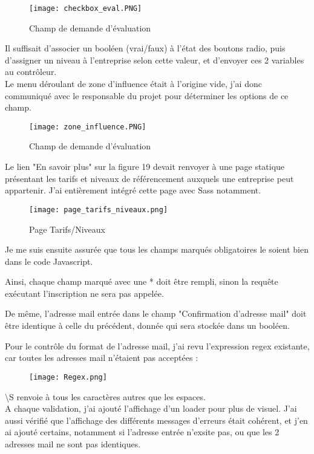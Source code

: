\begin{figure}[H]
    \texttt{[image: checkbox\_eval.PNG]}
    \caption{Champ de demande d'évaluation}
\end{figure}

Il suffisait d'associer un booléen (vrai/faux) à l'état des boutons radio, puis d'assigner un niveau à l'entreprise selon cette valeur, et d'envoyer ces 2 variables au contrôleur.\\

Le menu déroulant de zone d'influence était à l'origine vide, j'ai donc communiqué avec le responsable du projet pour déterminer les options de ce champ.

\begin{figure}[H]
    \texttt{[image: zone\_influence.PNG]}
    \caption{Champ de demande d'évaluation}
\end{figure}

Le lien "En savoir plus" sur la figure 19 devait renvoyer à une page statique présentant les tarifs et niveaux de référencement auxquels une entreprise peut appartenir. J'ai entièrement intégré cette page avec Sass notamment.

\begin{figure}[H]
    \texttt{[image: page\_tarifs\_niveaux.png]}
    \caption{Page Tarifs/Niveaux}
\end{figure}

Je me suis ensuite assurée que tous les champs marqués obligatoires le soient bien dans le code Javascript. 

Ainsi, chaque champ marqué avec une * doit être rempli, sinon la requête exécutant l'inscription ne sera pas appelée.

De même, l'adresse mail entrée dans le champ "Confirmation d'adresse mail" doit être identique à celle du précédent, donnée qui sera stockée dans un booléen.

Pour le contrôle du format de l'adresse mail, j'ai revu l'expression regex existante, car toutes les adresses mail n'étaient pas acceptées :

\begin{figure}[H]
    \texttt{[image: Regex.png]}
\end{figure}

\textbackslash S renvoie à tous les caractères autres que les espaces.\\

A chaque validation, j'ai ajouté l'affichage d'un loader pour plus de visuel. J'ai aussi vérifié que l'affichage des différents messages d'erreurs était cohérent, et j'en ai ajouté certains, notamment si l'adresse entrée n'exsite pas, ou que les 2 adresses mail ne sont pas identiques.\\

